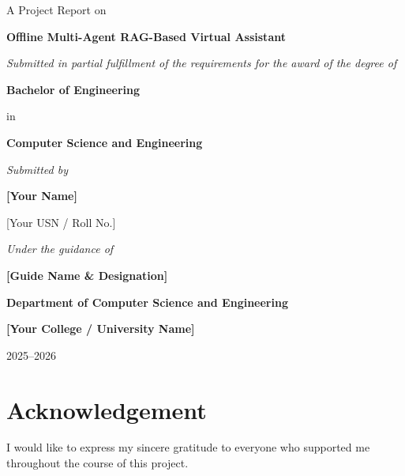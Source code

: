 \documentclass[12pt,a4paper]{report}
\newcommand{\ProjectTitle}{Offline Multi-Agent RAG-Based Virtual Assistant}
\newcommand{\StudentName}{[Your Name]}
\newcommand{\StudentID}{[Your USN / Roll No.]}
\newcommand{\GuideName}{[Guide Name \& Designation]}
\newcommand{\InstituteName}{[Your College / University Name]}
\newcommand{\DeptName}{Department of Computer Science and Engineering}
\newcommand{\AcademicYear}{2025--2026}
\begin{document}
\begin{titlepage}
\centering
\vspace*{0.4in}
{\large A Project Report on\par}
\vspace{0.3in}
{\LARGE\bfseries \ProjectTitle \par}
\vspace{0.4in}
{\large \textit{Submitted in partial fulfillment of the requirements for the award of the degree of}\par}
\vspace{0.15in}
{\large\bfseries Bachelor of Engineering\par}
{\large in\par}
{\large\bfseries Computer Science and Engineering\par}
\vspace{0.4in}
{\large \textit{Submitted by}\par}
\vspace{0.1in}
{\large\bfseries \StudentName\par}
{\large \StudentID\par}
\vspace{0.4in}
{\large \textit{Under the guidance of}\par}
{\large\bfseries \GuideName\par}
\vfill
{\large\bfseries \DeptName\par}
{\large\bfseries \InstituteName\par}
\vspace{0.15in}
{\large \AcademicYear\par}
\end{titlepage}


\chapter*{Acknowledgement}
I would like to express my sincere gratitude to everyone who supported me
throughout the course of this project.
\end{document}
